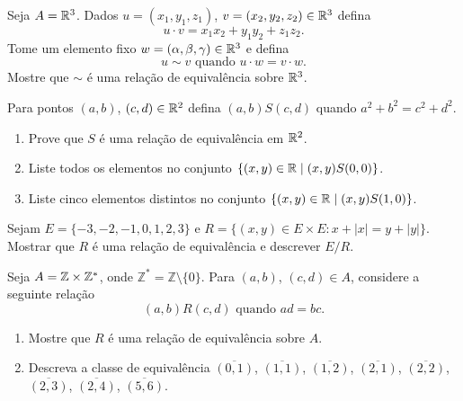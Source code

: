 \documentclass[12pt]{exam}
\begin{document}
\vspace{.3cm}

\questao{} Seja $A = \mathbb{R}^3$. Dados $u = (x_1, y_1, z_1)$, $v = (x_2, y_2, z_2) \in \mathbb{R}^3$ defina
\[
    u\cdot v = x_1x_2 + y_1y_2 + z_1z_2.
\]
Tome um elemento fixo $w = (\alpha, \beta, \gamma) \in \mathbb{R}^3$ e defina
\[
    u \sim v \mbox{ quando } u \cdot w = v \cdot w.
\]
Mostre que $\sim$ \'e uma rela\c{c}\~ao de equival\^encia sobre $\mathbb{R}^3$.

\vspace{.3cm}

\questao{} Para pontos $(a, b)$, $(c, d) \in \mathbb{R}^2$ defina $(a, b) S (c, d)$ quando $a^2 + b^2 = c^2 + d^2$.
\begin{enumerate}[label={\alph*})]
  \item Prove que $S$ \'e uma rela\c{c}\~ao de equival\^encia em $\mathbb{R}^2$.
  \item Liste todos os elementos no conjunto $\{(x, y) \in \mathbb{R} \mid (x, y) S (0, 0)\}$.
  \item Liste cinco elementos distintos no conjunto $\{(x, y) \in \mathbb{R} \mid (x, y) S (1, 0)\}$.
\end{enumerate}

\vspace{.3cm}

\questao{} Sejam $E = \{-3, -2, -1, 0, 1, 2, 3\}$ e $R = \{(x, y) \in E \times E : x + |x| = y + |y|\}$. Mostrar que $R$ \'e uma rela\c{c}\~ao de equival\^encia e descrever $E/R$.

\vspace{.3cm}

\questao{} Seja $A = \mathbb{Z} \times \mathbb{Z}^*$, onde $\mathbb{Z}^* = \mathbb{Z} \setminus \{0\}$. Para $(a,b)$, $(c,d) \in A$, considere a seguinte rela{\c c}{\~a}o
\[
    (a,b) R (c,d) \mbox{ quando } ad = bc.
\]
\begin{enumerate}[label={\alph*})]
    \item Mostre que $R$ {\'e} uma rela{\c c}{\~a}o de equival{\^e}ncia sobre $A$.
    \item Descreva a classe de equival{\^e}ncia $\overline{(0,1)}$, $\overline{(1,1)}$, $\overline{(1,2)}$, $\overline{(2,1)}$, $\overline{(2,2)}$, $\overline{(2,3)}$, $\overline{(2,4)}$, $\overline{(5,6)}$.
\end{enumerate}

\vspace{.3cm}

\end{document}
